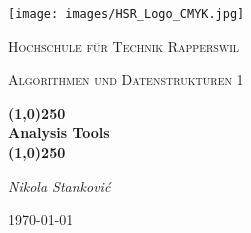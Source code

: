 \documentclass[a4paper,12pt]{scrreprt}
\newcommand{\documenttitel}{Analysis Tools}
\newcommand{\documentsubtitel}{Algorithmen und Datenstrukturen 1}
\newcommand{\documentauthors}{Nikola Stanković}
\begin{document}
\author{
  Stanković, Nikola
}

\begin{titlepage}
	\centering
	\texttt{[image: images/HSR\_Logo\_CMYK.jpg]}\par\vspace{1cm}
	{\scshape\LARGE Hochschule für Technik Rapperswil \par}
	\vspace{1cm}
	{\scshape\Large \documentsubtitel \par}
	\vspace{0.5cm}
	{\huge\bfseries \line(1,0){250} \\ \documenttitel \\ \line(1,0){250} \par}
	\vspace{2cm}
	{\Large\itshape \documentauthors \par}

	\vfill

	{\large \today\par}
\end{titlepage}

\tableofcontents

\end{document}
